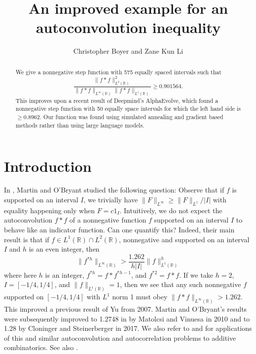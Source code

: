 \documentclass[reqno, 11pt]{amsart}
\title{An improved example for an autoconvolution inequality}
\author{Christopher Boyer and Zane Kun Li}
\newcommand{\R}[0]{\mathbb{R}}
\newcommand{\nms}[1]{\| #1 \|}
\theoremstyle{remark}
\begin{document}
\begin{abstract}
We give a nonnegative step function with 575 equally spaced intervals such that 
$$\frac{\nms{f \ast f}_{L^{2}(\R)}^{2}}{\nms{f \ast f}_{L^{\infty}(\R)}\nms{f \ast f}_{L^{1}(\R)}} \geq 0.901564.$$
This improves upon a recent result of Deepmind's AlphaEvolve, which found a nonnegative step function with 50 equally space intervals for which the left hand side is $\geq 0.8962$.
Our function was found using simulated annealing and gradient based methods rather than using large language models.
\end{abstract}

\maketitle

\section{Introduction}
In \cite{MartinOBryant}, Martin and O'Bryant studied the following question:
Observe that if $f$ is supported on an interval $I$, we trivially
have $\nms{F}_{L^{\infty}} \geq \nms{F}_{L^{1}}/|I|$ with equality
happening only when $F = c1_{I}$. Intuitively, we do not expect
the autoconvolution $f \ast f$ of a nonnegative function $f$
supported on an interval $I$ to behave like an indicator function.
Can one quantify this?
Indeed, their main result is that if $f \in L^{1}(\R) \cap L^{2}(\R)$, nonnegative and supported on an interval $I$ and $h$ is an even integer, then
$$\nms{f^{\ast h}}_{L^\infty(\R)} > \frac{1.262}{h|I|}\nms{f}_{L^{1}(\R)}^{h}$$
where here $h$ is an integer, $f^{\ast h} = f \ast f^{\ast h - 1}$, and $f^{\ast 2} = f \ast f$.
If we take $h = 2$, $I = [-1/4, 1/4]$, and $\nms{f}_{L^{1}(\R)} = 1$,
then we see that any such nonnegative $f$ supported on $[-1/4, 1/4]$
with $L^{1}$ norm 1 must obey $\nms{f \ast f}_{L^{\infty}(\R)} > 1.262$.
This improved a previous result of Yu \cite{Yu} from 2007. Martin and O'Bryant's
results were subsequently improved to 1.2748 in by Matolcsi and Vinuesa \cite{MatolcsiVinuesa} in 2010 and to 1.28 by Cloninger and Steinerberger \cite{CloningerSteinerberger} in 2017.
We also refer to \cite{BarnardSteinerberger} and \cite{MartinOBryant} for applications
of this and similar autoconvolution and autocorrelation problems to additive combinatorics. See also \cite[Problem 35]{BenGreen100}.
\end{document}
